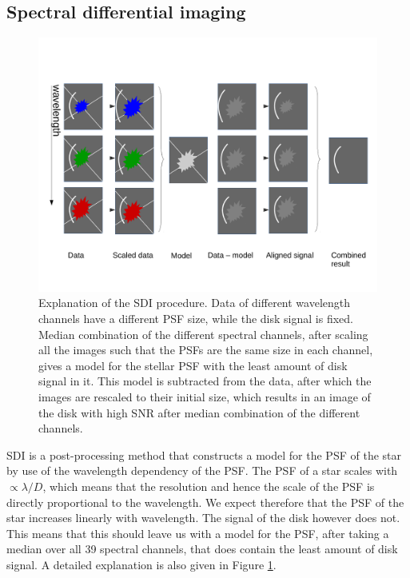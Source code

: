 \documentclass[twoside,single,12pt]{lion-msc}
\begin{document}
\subsection{Spectral differential imaging}
\begin{figure}[!t]
\centering
\vspace{-7mm}
\includegraphics[trim={0cm 1cm 0cm 3cm},clip,width = 1\textwidth]{sdiexplanation}
\caption{Explanation of the SDI procedure. Data of different wavelength channels have a different PSF size, while the disk signal is fixed. Median combination of the different spectral channels, after scaling all the images such that the PSFs are the same size in each channel, gives a model for the stellar PSF with the least amount of disk signal in it. This model is subtracted from the data, after which the images are rescaled to their initial size, which results in an image of the disk with high SNR after median combination of the different channels.} 
\label{fig:sdiexplanation}
\vspace{-3mm}
\end{figure}

SDI is a post-processing method that constructs a model for the PSF of the star by use of the wavelength dependency of the PSF. The PSF of a star scales with $ \propto\lambda/D$, which means that the resolution and hence the scale of the PSF is directly proportional to the wavelength. We expect therefore that the PSF of the star increases linearly with wavelength. The signal of the disk however does not. This means that this should leave us with a model for the PSF, after taking a median over all 39 spectral channels, that does contain the least amount of disk signal. A detailed explanation is also given in Figure \ref{fig:sdiexplanation}.
\bigskip
\end{document}
